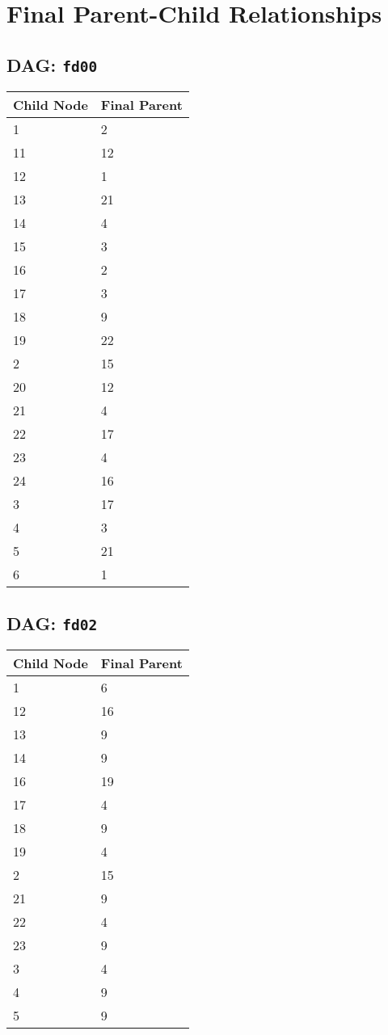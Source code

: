 \documentclass{article}
\begin{document}
\pagestyle{fancy}
\fancyhf{}
\section*{Final Parent-Child Relationships}
\subsection*{DAG: \texttt{fd00}}
\begin{tabular}{ll}
\toprule
\textbf{Child Node} & \textbf{Final Parent} \\
\midrule
1 & 2 \\
11 & 12 \\
12 & 1 \\
13 & 21 \\
14 & 4 \\
15 & 3 \\
16 & 2 \\
17 & 3 \\
18 & 9 \\
19 & 22 \\
2 & 15 \\
20 & 12 \\
21 & 4 \\
22 & 17 \\
23 & 4 \\
24 & 16 \\
3 & 17 \\
4 & 3 \\
5 & 21 \\
6 & 1 \\
\bottomrule
\end{tabular}

\subsection*{DAG: \texttt{fd02}}
\begin{tabular}{ll}
\toprule
\textbf{Child Node} & \textbf{Final Parent} \\
\midrule
1 & 6 \\
12 & 16 \\
13 & 9 \\
14 & 9 \\
16 & 19 \\
17 & 4 \\
18 & 9 \\
19 & 4 \\
2 & 15 \\
21 & 9 \\
22 & 4 \\
23 & 9 \\
3 & 4 \\
4 & 9 \\
5 & 9 \\
\bottomrule
\end{tabular}
\end{document}
